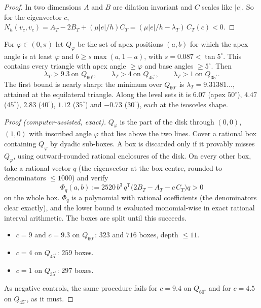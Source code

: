 \begin{proof}
In two dimensions $A$ and $B$ are dilation invariant and $C$ scales like $|e|$. So for the eigenvector $c$,
$N_h(v_c,v_c)=A_T-2B_T+(\mu|e|/h)C_T=(\mu|e|/h-\lambda_T)\,C_T(c)<0$.
\end{proof}

\begin{proposition}\label{pb:cert}
For $\varphi\in(0,\pi)$ let $Q_\varphi$ be the set of apex positions $(a,b)$ for which the apex angle is at least $\varphi$ and $b\ge
s\max(a,1-a)$, with $s=0.087<\tan5^\circ$. This contains every triangle with apex angle $\ge\varphi$ and base angles $\ge5^\circ$.
Then
\[
\lambda_T>9.3\ \text{on }Q_{60^\circ},\qquad \lambda_T>4\ \text{on }Q_{45^\circ},\qquad \lambda_T>1\ \text{on }Q_{35^\circ}.
\]
The first bound is nearly sharp: the minimum over $Q_{60^\circ}$ is $\lambda_T=9.31381\ldots$, attained at the equilateral
triangle. Along the level sets it is $6.07$ (apex $50^\circ$), $4.47$ ($45^\circ$), $2.83$ ($40^\circ$), $1.12$ ($35^\circ$) and
$-0.73$ ($30^\circ$), each at the isosceles shape.
\end{proposition}

\begin{proof}[Proof (computer-assisted, exact)]
$Q_\varphi$ is the part of the disk through $(0,0)$, $(1,0)$ with inscribed angle $\varphi$ that lies above the two lines. Cover a
rational box containing $Q_\varphi$ by dyadic sub-boxes. A box is discarded only if it provably misses $Q_\varphi$, using
outward-rounded rational enclosures of the disk. On every other box, take a rational vector $q$ (the eigenvector at the box
centre, rounded to denominators $\le1000$) and verify
\[
\Phi_q(a,b):=2520\,b^3\,q^{\mathsf T}\bigl(2B_T-A_T-c\,C_T\bigr)q>0
\]
on the whole box. $\Phi_q$ is a polynomial with rational coefficients (the denominators clear exactly), and the lower bound is
evaluated monomial-wise in exact rational interval arithmetic. The boxes are split until this succeeds.
\begin{itemize}
\item $c=9$ and $c=9.3$ on $Q_{60^\circ}$: $323$ and $716$ boxes, depth $\le11$.
\item $c=4$ on $Q_{45^\circ}$: $259$ boxes.
\item $c=1$ on $Q_{35^\circ}$: $297$ boxes.
\end{itemize}
As negative controls, the same procedure fails for $c=9.4$ on $Q_{60^\circ}$ and for $c=4.5$ on $Q_{45^\circ}$, as it must.
\end{proof}

